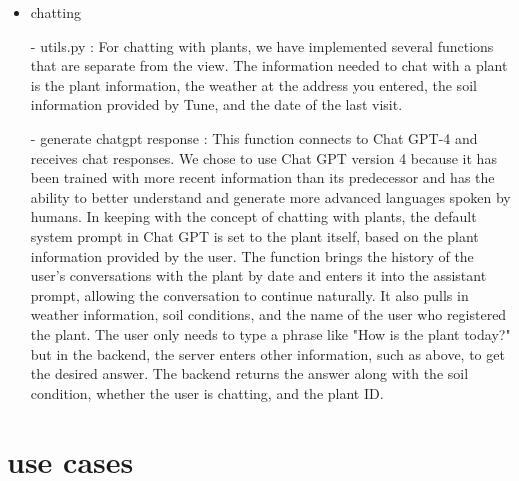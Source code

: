\documentclass[conference, a4paper]{IEEEtran}
\begin{document}
\begin{enumerate}
\begin{itemize}
        \item chatting
        \item[-] utils.py : For chatting with plants, we have implemented several functions that are separate from the view. The information needed to chat with a plant is the plant information, the weather at the address you entered, the soil information provided by Tune, and the date of the last visit.
        \item[-] generate chatgpt response : This function connects to Chat GPT-4 and receives chat responses. We chose to use Chat GPT version 4 because it has been trained with more recent information than its predecessor and has the ability to better understand and generate more advanced languages spoken by humans. In keeping with the concept of chatting with plants, the default system prompt in Chat GPT is set to the plant itself, based on the plant information provided by the user. The function brings the history of the user's conversations with the plant by date and enters it into the assistant prompt, allowing the conversation to continue naturally. It also pulls in weather information, soil conditions, and the name of the user who registered the plant. The user only needs to type a phrase like "How is the plant today?" but in the backend, the server enters other information, such as above, to get the desired answer. The backend returns the answer along with the soil condition, whether the user is chatting, and the plant ID.
    \end{itemize}
\end{enumerate}

\newpage

\section{use cases}
\end{document}
